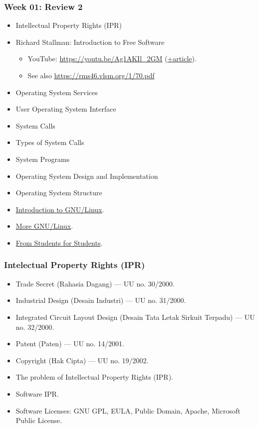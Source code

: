 \documentclass[aspectratio=169, xcolor=table, notheorems, hyperref={pdfpagelabels=false}]{beamer}
\begin{document}

\begin{frame}
\frametitle{Week 01: Review 2}

\begin{itemize}
\item Intellectual Property Rights (IPR)
\item Richard Stallman: Introduction to Free Software
\begin{itemize}
\item YouTube: \url{https://youtu.be/Ag1AKIl_2GM} 
      (\href{https://www.fsf.org/blogs/rms/20140407-geneva-tedx-talk-free-software-free-society}{+article}).
\item See also \url{https://rms46.vlsm.org/1/70.pdf}
\end{itemize}
\item Operating System Services
\item User Operating System Interface
\item System Calls
\item Types of System Calls
\item System Programs
\item Operating System Design and Implementation
\item Operating System Structure
\item \href{https://doit.vlsm.org/038.html}{Introduction to GNU/Linux}.
\item \href{https://doit.vlsm.org/039.html}{More GNU/Linux}.
\item \href{https://doit.vlsm.org/040.html}{From Students for Students}.
\end{itemize}
\end{frame}

\begin{frame}
\frametitle{Intelectual Property Rights (IPR)}
\begin{itemize}
\item Trade Secret (Rahasia Dagang) --- UU no. 30/2000.
\item Industrial Design (Desain Industri) --- UU no. 31/2000.
\item Integrated Circuit Layout Design (Desain Tata Letak Sirkuit Terpadu) --- UU no. 32/2000.
\item Patent (Paten) --- UU no. 14/2001.
\item Copyright (Hak Cipta) --- UU no. 19/2002.
\item The problem of Intellectual Property Rights (IPR).
\item Software IPR.
\item Software Licenses: GNU GPL, EULA, Public Domain, Apache, Microsoft Public License.
\end{itemize}
\end{frame}
\end{document}
